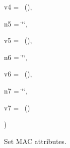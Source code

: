 {\begin{DoxyParamCaption}
\item[{const {\bf Attribute\+Value} \&}]{v4 = {~()}, }
\item[{std\+::string}]{n5 = {\ttfamily \char`\"{}\char`\"{}}, }
\item[{const {\bf Attribute\+Value} \&}]{v5 = {~()}, }
\item[{std\+::string}]{n6 = {\ttfamily \char`\"{}\char`\"{}}, }
\item[{const {\bf Attribute\+Value} \&}]{v6 = {~()}, }
\item[{std\+::string}]{n7 = {\ttfamily \char`\"{}\char`\"{}}, }
\item[{const {\bf Attribute\+Value} \&}]{v7 = {~()}}
\end{DoxyParamCaption}
)}\hypertarget{classns3_1_1UanHelper_a1c99a2afa329597107452c42eb9c43b9}{}\label{classns3_1_1UanHelper_a1c99a2afa329597107452c42eb9c43b9}
Set M\+AC attributes.


